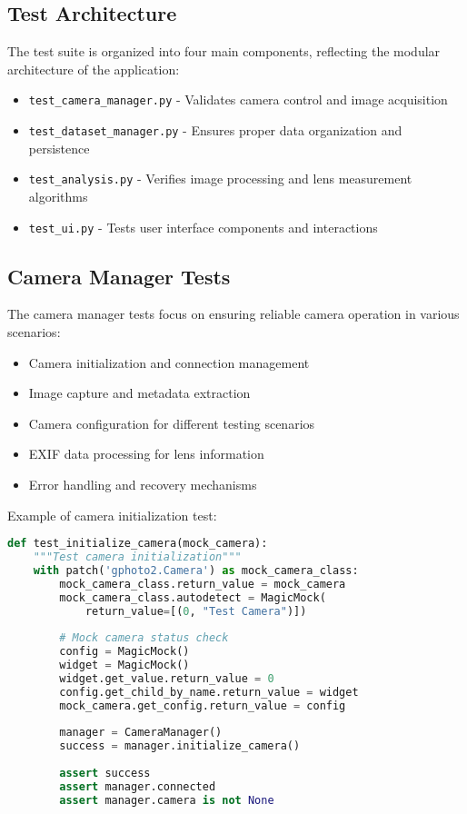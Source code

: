 \subsection{Test Architecture}
The test suite is organized into four main components, reflecting the modular architecture of the application:
\begin{itemize}
    \item \texttt{test\_camera\_manager.py} - Validates camera control and image acquisition
    \item \texttt{test\_dataset\_manager.py} - Ensures proper data organization and persistence
    \item \texttt{test\_analysis.py} - Verifies image processing and lens measurement algorithms
    \item \texttt{test\_ui.py} - Tests user interface components and interactions
\end{itemize}

\subsection{Camera Manager Tests}
The camera manager tests focus on ensuring reliable camera operation in various scenarios:
\begin{itemize}
    \item Camera initialization and connection management
    \item Image capture and metadata extraction
    \item Camera configuration for different testing scenarios
    \item EXIF data processing for lens information
    \item Error handling and recovery mechanisms
\end{itemize}

Example of camera initialization test:
\begin{lstlisting}[language=Python]
def test_initialize_camera(mock_camera):
    """Test camera initialization"""
    with patch('gphoto2.Camera') as mock_camera_class:
        mock_camera_class.return_value = mock_camera
        mock_camera_class.autodetect = MagicMock(
            return_value=[(0, "Test Camera")])
        
        # Mock camera status check
        config = MagicMock()
        widget = MagicMock()
        widget.get_value.return_value = 0
        config.get_child_by_name.return_value = widget
        mock_camera.get_config.return_value = config
        
        manager = CameraManager()
        success = manager.initialize_camera()
        
        assert success
        assert manager.connected
        assert manager.camera is not None
\end{lstlisting}

